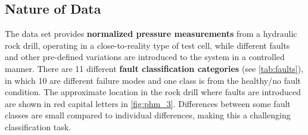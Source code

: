 \subsection{Nature of Data}


The data set provides \textbf{normalized pressure measurements} from a hydraulic rock drill, operating in a close-to-reality type of test cell, while different faults and other  pre-defined variations are introduced to the system in a controlled manner. 
There are 11 different \textbf{fault classification categories} (see \cref{tab:faults}), in which 10 are different failure modes and one class is from the healthy/no fault condition. 
The approximate location in the rock drill where faults are introduced are shown in red capital letters in \cref{fig:phm_3}. %
Differences between some fault classes are small compared to individual differences, making this a challenging classification task.


